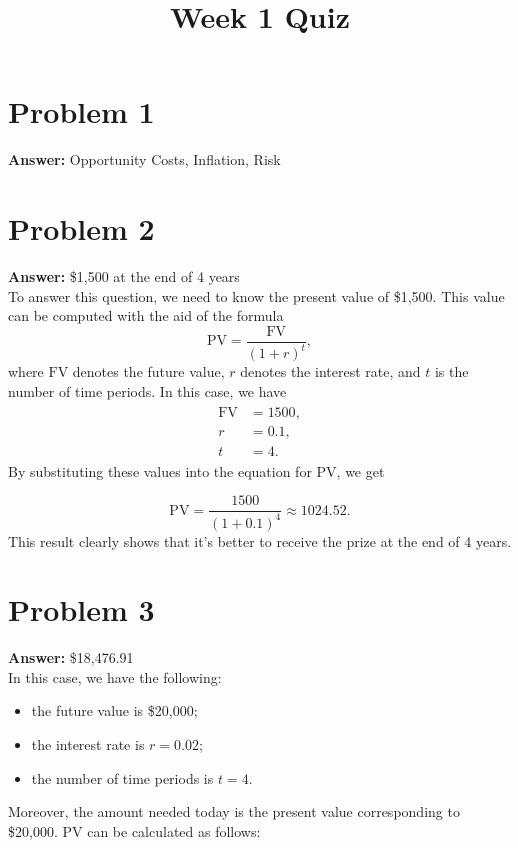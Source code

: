 \documentclass[11pt]{article}
\date{}
\title{Week 1 Quiz}
\newcommand{\pv}{\mathrm{PV}}
\newcommand{\fv}{\mathrm{FV}}
\begin{document}
\thispagestyle{empty}
\pagestyle{empty}
\section*{Problem 1}
\label{sec:orgcb0cc4d}

\textbf{Answer:} Opportunity Costs, Inflation, Risk
\section*{Problem 2}
\label{sec:org90feb7b}

\textbf{Answer:} \$1,500 at the end of 4 years\\

To answer this question, we need to know the present value of \$1,500. This value
can be computed with the aid of the formula
\begin{equation}
\pv=\frac{\fv}{(1+r)^t},
\end{equation}
where \(\fv\) denotes the future value, \(r\) denotes the interest rate, and
\(t\) is the number of time periods. In this case, we have
\begin{align}
  \begin{split}
    \fv&=1500,\\
    r&=0.1,\\
    t&=4.
  \end{split}
\end{align}
By substituting these values into the equation for \(\pv\), we get

\begin{equation}
\pv=\frac{1500}{(1+0.1)^4}\approx 1024.52.
\end{equation}
This result clearly shows that it's better to receive the prize at the end of 4
years.
\section*{Problem 3}
\label{sec:org673d4a4}

\textbf{Answer:} \$18,476.91\\

In this case, we have the following:
\begin{itemize}
\item the future value is \$20,000;
\item the interest rate is \(r=0.02\);
\item the number of time periods is \(t=4\).
\end{itemize}
Moreover, the amount needed today is the present value corresponding to \$20,000.
\(\pv\) can be calculated as follows:
\end{document}
